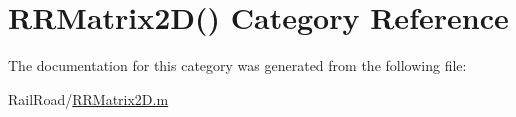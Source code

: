 \hypertarget{category_r_r_matrix2_d_07_08}{\section{R\-R\-Matrix2\-D() Category Reference}
\label{category_r_r_matrix2_d_07_08}
}


The documentation for this category was generated from the following file\-:\begin{DoxyCompactItemize}
\item 
Rail\-Road/\hyperlink{_r_r_matrix2_d_8m}{R\-R\-Matrix2\-D.\-m}\end{DoxyCompactItemize}
